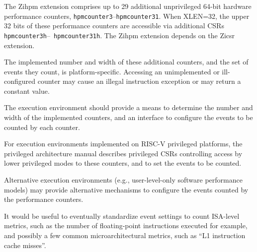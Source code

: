 The Zihpm extension comprises up to 29 additional unprivileged 64-bit
hardware performance counters, {\tt hpmcounter3}--{\tt hpmcounter31}.
When XLEN=32, the upper 32 bits of these performance counters are
accessible via additional CSRs {\tt hpmcounter3h}--{\tt
  hpmcounter31h}.  The Zihpm extension depends on the Zicsr extension.

The implemented number and width of these additional counters, and the
set of events they count, is platform-specific.  Accessing an
unimplemented or ill-configured counter may cause an illegal
instruction exception or may return a constant value.

The execution environment should provide a means to determine the
number and width of the implemented counters, and an interface to
configure the events to be counted by each counter.

\begin{commentary}
  For execution environments implemented on RISC-V privileged
  platforms, the privileged architecture manual describes privileged
  CSRs controlling access by lower privileged modes to these counters,
  and to set the events to be counted.

  Alternative execution environments (e.g., user-level-only software
  performance models) may provide alternative mechanisms to configure
  the events counted by the performance counters.

  It would be useful to eventually standardize event settings to count
  ISA-level metrics, such as the number of floating-point instructions
  executed for example, and possibly a few common microarchitectural
  metrics, such as ``L1 instruction cache misses''.
\end{commentary}

